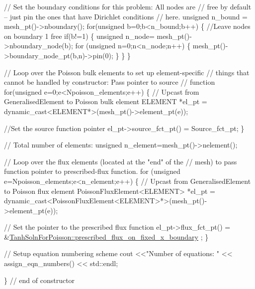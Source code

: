 \begin{DoxyCodeInclude}
 \textcolor{comment}{// Set the boundary conditions for this problem: All nodes are}
 \textcolor{comment}{// free by default -- just pin the ones that have Dirichlet conditions}
 \textcolor{comment}{// here. }
 \textcolor{keywordtype}{unsigned} n\_bound = mesh\_pt()->nboundary();
 \textcolor{keywordflow}{for}(\textcolor{keywordtype}{unsigned} b=0;b<n\_bound;b++)
  \{
   \textcolor{comment}{//Leave nodes on boundary 1 free}
   \textcolor{keywordflow}{if}(b!=1)
    \{
     \textcolor{keywordtype}{unsigned} n\_node= mesh\_pt()->nboundary\_node(b);
     \textcolor{keywordflow}{for} (\textcolor{keywordtype}{unsigned} n=0;n<n\_node;n++)
      \{
       mesh\_pt()->boundary\_node\_pt(b,n)->pin(0); 
      \}
    \}
  \}

 \textcolor{comment}{// Loop over the Poisson bulk elements to set up element-specific }
 \textcolor{comment}{// things that cannot be handled by constructor: Pass pointer to source}
 \textcolor{comment}{// function}
 \textcolor{keywordflow}{for}(\textcolor{keywordtype}{unsigned} e=0;e<Npoisson\_elements;e++)
  \{
   \textcolor{comment}{// Upcast from GeneralisedElement to Poisson bulk element}
   ELEMENT *el\_pt = \textcolor{keyword}{dynamic\_cast<}ELEMENT*\textcolor{keyword}{>}(mesh\_pt()->element\_pt(e));

   \textcolor{comment}{//Set the source function pointer}
   el\_pt->source\_fct\_pt() = Source\_fct\_pt;
  \}

 \textcolor{comment}{// Total number of elements:}
 \textcolor{keywordtype}{unsigned} n\_element=mesh\_pt()->nelement();
 
 \textcolor{comment}{// Loop over the flux elements (located at the "end" of the}
 \textcolor{comment}{// mesh) to pass function pointer to prescribed-flux function.}
 \textcolor{keywordflow}{for} (\textcolor{keywordtype}{unsigned} e=Npoisson\_elements;e<n\_element;e++)
  \{
   \textcolor{comment}{// Upcast from GeneralisedElement to Poisson flux element}
   PoissonFluxElement<ELEMENT> *el\_pt = 
    \textcolor{keyword}{dynamic\_cast<}PoissonFluxElement<ELEMENT>*\textcolor{keyword}{>}(mesh\_pt()->element\_pt(e));

   \textcolor{comment}{// Set the pointer to the prescribed flux function}
   el\_pt->flux\_fct\_pt() = 
    &\hyperlink{namespaceTanhSolnForPoisson_a0e99ccf27df36f28f091de6d57484172}{TanhSolnForPoisson::prescribed\_flux\_on\_fixed\_x\_boundary}
      ;
  \}

 \textcolor{comment}{// Setup equation numbering scheme}
 cout <<\textcolor{stringliteral}{"Number of equations: "} << assign\_eqn\_numbers() << std::endl; 

\} \textcolor{comment}{// end of constructor}

\end{DoxyCodeInclude}




